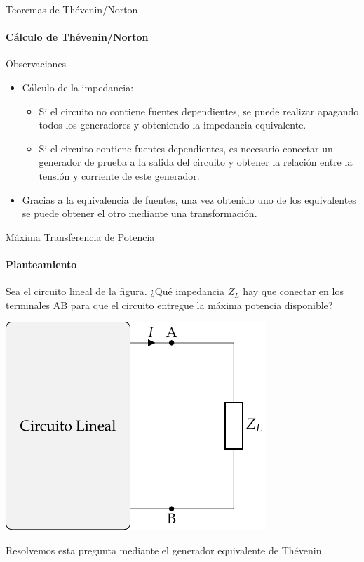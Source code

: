 \documentclass[aspectratio=169, usenames,svgnames,dvipsnames]{beamer}
\begin{document}
\begin{frame}[label={sec:orgfb49190}]{Teoremas de Thévenin/Norton}
\framesubtitle{Cálculo de Thévenin/Norton}

\begin{block}{Observaciones}
\begin{itemize}
\item Cálculo de la impedancia:
\begin{itemize}
\item Si el circuito \alert{no} contiene fuentes dependientes, se puede realizar \alert{apagando} todos los \alert{generadores} y obteniendo la impedancia equivalente.
\item Si el circuito contiene fuentes dependientes, es necesario conectar un \alert{generador de prueba} a la salida del circuito y obtener la relación entre la tensión y corriente de este generador.
\end{itemize}

\item Gracias a la equivalencia de fuentes, una vez obtenido uno de los equivalentes se puede obtener el otro mediante una transformación.
\end{itemize}
\end{block}
\end{frame}

\begin{frame}[label={sec:org8396067}]{Máxima Transferencia de Potencia}
\framesubtitle{Planteamiento}
Sea el circuito lineal de la figura. ¿Qué impedancia \(Z_L\) hay que conectar en los terminales AB para que el circuito entregue la máxima potencia disponible?

\begin{center}
\includegraphics[height=0.55\textheight]{../figs/CircuitoLineal_ZL.pdf}
\end{center}

Resolvemos esta pregunta mediante el generador equivalente de Thévenin.
\end{frame}
\end{document}
